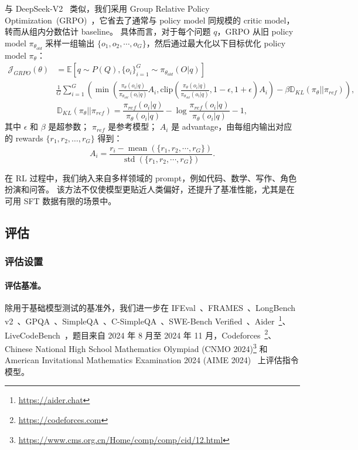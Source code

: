 \documentclass[11pt, a4paper, logo, copyright, nonumbering]{deepseek}
\newcommand{\dsvii}{DeepSeek-V2}
\begin{document}
与 \dsvii{}~\citep{dsvii} 类似，我们采用 Group Relative Policy Optimization~(GRPO)~\citep{deepseekmath}，它省去了通常与 policy model 同规模的 critic model，转而从组内分数估计 baseline。
具体而言，对于每个问题 $q$，GRPO 从旧 policy model $\pi_{\theta_{old}}$ 采样一组输出 $\{o_1, o_2, \cdots, o_G\}$，然后通过最大化以下目标优化 policy model $\pi_{\theta}$：
\begin{equation}
\begin{split}
    \mathcal{J}_{GRPO}(\theta) &= \mathbb{E}{[q \sim P(Q), \{o_i\}_{i=1}^G \sim \pi_{\theta_{old}}(O|q)]}  \\
    & \frac{1}{G}\sum_{i=1}^G \left( \min \left( \frac{\pi_\theta(o_i |q)}{\pi_{\theta_{old}}(o_i |q)} A_i, \text{clip} \left( \frac{\pi_\theta(o_i |q)}{\pi_{\theta_{old}}(o_i |q)}, 1 - \epsilon, 1 + \epsilon \right)  A_i \right) - \beta \mathbb{D}_{KL}\left(\pi_{\theta} || \pi_{ref}\right)\right) ,
\end{split}
\label{eq:GRPO-obj}
\end{equation}
\begin{equation}
    \mathbb{D}_{KL}\left(\pi_{\theta} || \pi_{ref}\right) = \frac{\pi_{ref}(o_i|q)}{\pi_{\theta}(o_i|q)}- \log\frac{\pi_{ref}(o_i|q)}{\pi_{\theta}(o_i|q)} - 1,
\end{equation}
其中 $\epsilon$ 和 $\beta$ 是超参数；
$\pi_{ref}$ 是参考模型；
$A_i$ 是 advantage，由每组内输出对应的 rewards $\{r_1, r_2, \ldots, r_G\}$ 得到：
\begin{equation}
    A_i = \frac{r_i - {\operatorname{mean}(\{r_1, r_2, \cdots, r_G\})}}{{\operatorname{std}(\{r_1, r_2, \cdots, r_G\})}}.
\end{equation}

在 RL 过程中，我们纳入来自多样领域的 prompt，例如代码、数学、写作、角色扮演和问答。
该方法不仅使模型更贴近人类偏好，还提升了基准性能，尤其是在可用 SFT 数据有限的场景中。

\subsection{评估}

\subsubsection{评估设置}

\paragraph{评估基准。}
除用于基础模型测试的基准外，我们进一步在 IFEval~\citep{IFeval}、FRAMES~\citep{frames}、LongBench v2~\citep{bai2024longbench2}、GPQA~\citep{gpqa}、SimpleQA~\citep{simpleqa}、C-SimpleQA~\citep{csimpleqa}、SWE-Bench Verified~\citep{swe_verified}、Aider~\footnote{\url{https://aider.chat}}、LiveCodeBench~\citep{livecodebench}，题目来自 2024 年 8 月至 2024 年 11 月，Codeforces~\footnote{\url{https://codeforces.com}}、Chinese National High School Mathematics Olympiad (CNMO 2024)\footnote{\url{https://www.cms.org.cn/Home/comp/comp/cid/12.html}} 和 American Invitational Mathematics Examination 2024 (AIME 2024)~\citep{AIME2024} 上评估指令模型。
\end{document}
